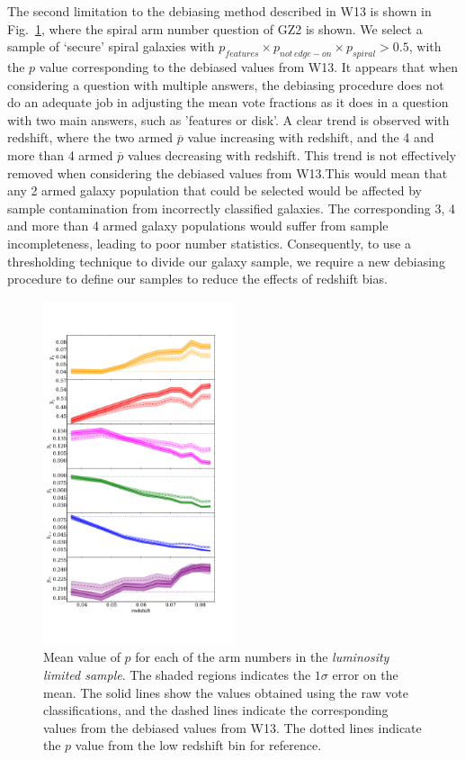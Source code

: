 \documentclass[useAMS,usenatbib]{mn2e}
\begin{document}
The second limitation to the debiasing method described in W13 is shown in Fig.~\ref{fig:arm_bias}, where the spiral arm number question of GZ2 is shown. We select a sample of `secure' spiral galaxies with $p_{features} \times p_{not \, edge-on} \times p_{spiral} > 0.5$, with the $p$ value corresponding to the debiased values from W13. It appears that when considering a question with multiple answers, the debiasing procedure does not do an adequate job in adjusting the mean vote fractions as it does in a question with two main answers, such as 'features or disk'. A clear trend is observed with redshift, where the two armed $\overline{p}$ value increasing with redshift, and the 4 and more than 4 armed $\overline{p}$ values decreasing with redshift. This trend is not effectively removed when considering the debiased values from W13.This would mean that any 2 armed galaxy population that could be selected would be affected by sample contamination from incorrectly classified galaxies. The corresponding 3, 4 and more than 4 armed galaxy populations would suffer from sample incompleteness, leading to poor number statistics. Consequently, to use a thresholding technique to divide our galaxy sample, we require a new debiasing procedure to define our samples to reduce the effects of redshift bias.

\begin{figure}
		\centering

        \includegraphics[width=0.5\textwidth]{Data_imgs/arm_bias.pdf}

        \caption{Mean value of $p$ for each of the arm numbers in the \textit{luminosity limited sample}. The shaded regions indicates the $1 \sigma$ error on the mean. The solid lines show the values obtained using the raw vote classifications, and the dashed lines indicate the corresponding values from the debiased values from W13. The dotted lines indicate the $p$ value from the low redshift bin for reference.}

        \label{fig:arm_bias}

\end{figure}
\end{document}
